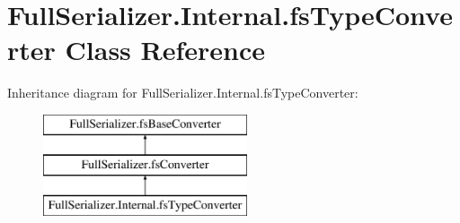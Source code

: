 \hypertarget{class_full_serializer_1_1_internal_1_1fs_type_converter}{}\section{Full\+Serializer.\+Internal.\+fs\+Type\+Converter Class Reference}
\label{class_full_serializer_1_1_internal_1_1fs_type_converter}
Inheritance diagram for Full\+Serializer.\+Internal.\+fs\+Type\+Converter\+:\begin{figure}[H]
\begin{center}
\leavevmode
\includegraphics[height=3.000000cm]{class_full_serializer_1_1_internal_1_1fs_type_converter}
\end{center}
\end{figure}
